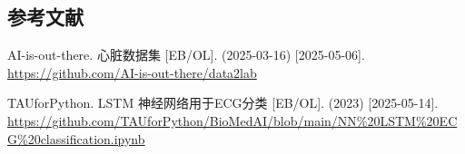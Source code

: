 \documentclass{article}
\providecommand{\pcsync}{\par\vspace{\baselineskip}}
\begin{document}
\begin{paracol}{2}
\switchcolumn

\section{参考文献}
\pcsync
\renewcommand{\refname}{}
\begin{thebibliography}{9}

AI-is-out-there. 心脏数据集 [EB/OL]. (2025-03-16) [2025-05-06]. \url{https://github.com/AI-is-out-there/data2lab}


TAUforPython. LSTM 神经网络用于ECG分类 [EB/OL]. (2023) [2025-05-14]. \url{https://github.com/TAUforPython/BioMedAI/blob/main/NN%20LSTM%20ECG%20classification.ipynb}

\end{thebibliography}

\vfill\null

\switchcolumn*








\end{paracol}
\balance
\end{document}
